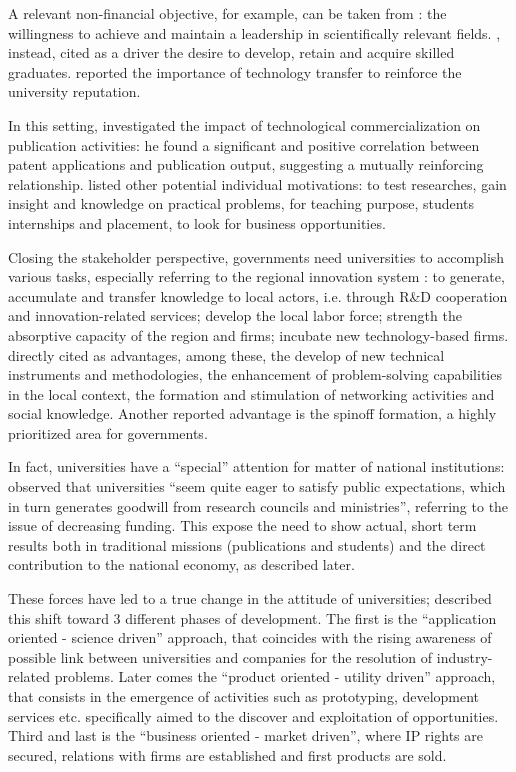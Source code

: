 A relevant non-financial objective, for example, can be taken from \citet{Tijssen2006}: the willingness to achieve and maintain a leadership in scientifically relevant fields. \citet{Leitch2005}, instead, cited as a driver the desire to develop, retain and acquire skilled graduates. \citet{Baldini2006} reported the importance of technology transfer to reinforce the university reputation. 

In this setting, \citet{Wong2010} investigated the impact of technological commercialization on publication activities: he found a significant and positive correlation between patent applications and publication output, suggesting a mutually reinforcing relationship. \citet{Lee2000} listed other potential individual motivations: to test researches, gain insight and knowledge on practical problems, for teaching purpose, students internships and placement, to look for business opportunities. 

Closing the stakeholder perspective, governments need universities to accomplish various tasks, especially referring to the regional innovation system \citep{Fritsch2007,Balderi2007}: to generate, accumulate and transfer knowledge to local actors, i.e. through R\&D cooperation and innovation-related services; develop the local labor force; strength the absorptive capacity of the region and firms; incubate new technology-based firms. \citet{AzagraCaro2010} directly cited as advantages, among these, the develop of new technical instruments and methodologies, the enhancement of problem-solving capabilities in the local context, the formation and stimulation of networking activities and social knowledge. Another reported advantage is the spinoff formation, a highly prioritized area for governments.

In fact, universities have a \enquote{special} attention for matter of national institutions: \citet{Rasmussen2006} observed that universities \enquote{seem quite eager to satisfy public expectations, which in turn generates goodwill from research councils and ministries}, referring to the issue of decreasing funding. This expose the need to show actual, short term results both in traditional missions (publications and students) and the direct contribution to the national economy, as described later.

These forces have led to a true change in the attitude of universities; \citet{Tijssen2006} described this shift toward 3 different phases of development. The first is the \enquote{application oriented - science driven} approach, that coincides with the rising awareness of possible link between universities and companies for the resolution of industry-related problems. Later comes the \enquote{product oriented - utility driven} approach, that consists in the emergence of activities such as prototyping, development services etc. specifically aimed to the discover and exploitation of opportunities. Third and last is the \enquote{business oriented - market driven}, where IP rights are secured, relations with firms are established and first products are sold.

